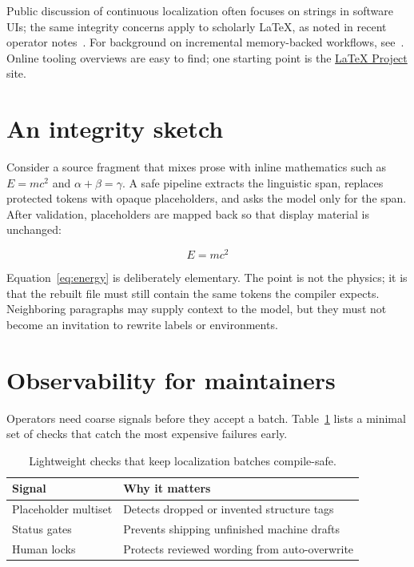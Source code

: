 \documentclass[11pt]{article}
\begin{document}
Public discussion of continuous localization often focuses on strings in
software UIs; the same integrity concerns apply to scholarly \LaTeX{}, as
noted in recent operator notes~\cite{integrity2024}. For background on
incremental memory-backed workflows, see~\cite{workflow2025}. Online
tooling overviews are easy to find; one starting point is the
\href{https://www.latex-project.org/}{\LaTeX{} Project} site.

\section{An integrity sketch}
\label{sec:model}

Consider a source fragment that mixes prose with inline mathematics such as
$E = mc^{2}$ and $\alpha + \beta = \gamma$. A safe pipeline extracts the
linguistic span, replaces protected tokens with opaque placeholders, and
asks the model only for the span. After validation, placeholders are mapped
back so that display material is unchanged:

\begin{equation}
\label{eq:energy}
E = mc^{2}
\end{equation}

Equation~\eqref{eq:energy} is deliberately elementary. The point is not the
physics; it is that the rebuilt file must still contain the same tokens the
compiler expects. Neighboring paragraphs may supply context to the model,
but they must not become an invitation to rewrite labels or environments.

\section{Observability for maintainers}
\label{sec:observe}

Operators need coarse signals before they accept a batch. Table~\ref{tab:signals}
lists a minimal set of checks that catch the most expensive failures early.

\begin{table}[ht]
  \centering
  \begin{tabular}{@{}ll@{}}
    \toprule
    Signal & Why it matters \\
    \midrule
    Placeholder multiset & Detects dropped or invented structure tags \\
    Status gates & Prevents shipping unfinished machine drafts \\
    Human locks & Protects reviewed wording from auto-overwrite \\
    \bottomrule
  \end{tabular}
  \caption{Lightweight checks that keep localization batches compile-safe.}
  \label{tab:signals}
\end{table}
\end{document}
